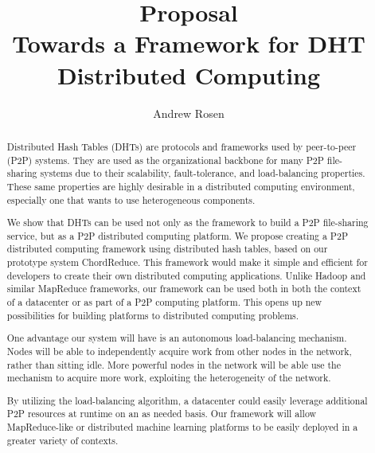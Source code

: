 \documentclass[10pt,letterpaper]{report}
\title{Proposal \\ Towards a Framework for DHT Distributed Computing}
\author{Andrew Rosen}
\begin{document}
\maketitle




\setcounter{tocdepth}{4}
\tableofcontents
\newpage

\begin{abstract}
Distributed Hash Tables (DHTs) are protocols and frameworks used by peer-to-peer (P2P) systems.
They are used as the organizational backbone for many P2P file-sharing systems due to their scalability, fault-tolerance, and load-balancing properties.
These same properties are highly desirable in a distributed computing environment, especially one that wants to use heterogeneous components.

We show that DHTs can be used not only as the framework to build a P2P file-sharing service, but as a P2P distributed computing platform.
We propose creating a P2P distributed computing framework using distributed hash tables, based on our prototype system ChordReduce.
This framework would make it simple and efficient for developers to create their own distributed computing applications.
Unlike Hadoop and similar MapReduce frameworks, our framework can be used both in both the context of a datacenter or as part of a P2P computing platform.  
This opens up new possibilities for building platforms to distributed computing problems.

One advantage our system will have is an autonomous load-balancing mechanism.
Nodes will be able to independently acquire work from other nodes in the network, rather than sitting idle.
More powerful nodes in the network will be able use the mechanism to acquire more work, exploiting the heterogeneity of the network.

By utilizing the load-balancing algorithm, a datacenter could easily leverage additional P2P resources at runtime on an as needed basis.
Our framework will allow MapReduce-like or distributed machine learning platforms to be easily deployed in a greater variety of contexts.


\end{abstract}






%



\end{document}
